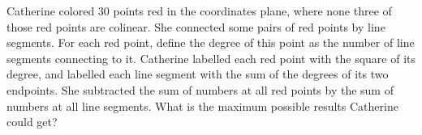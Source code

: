Catherine colored $30$ points red in the coordinates plane, where none three of those red points are colinear. She connected some pairs of red points by line segments. For each red point, define the degree of this point as the number of line segments connecting to it. Catherine labelled each red point with the square of its degree, and labelled each line segment with the sum of the degrees of its two endpoints. She subtracted the sum of numbers at all red points by the sum of numbers at all line segments. What is the maximum possible results Catherine could get?
